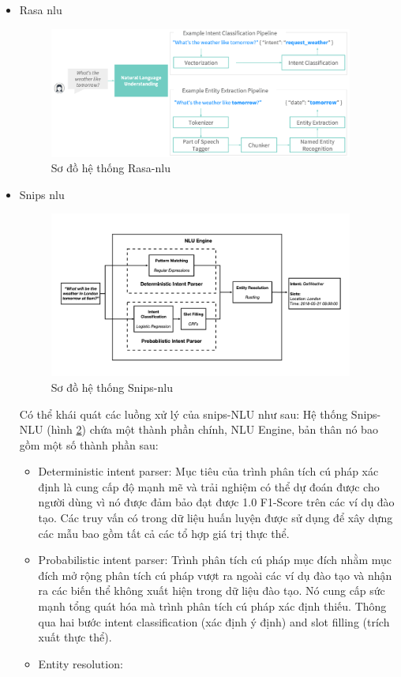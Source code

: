 \begin{itemize}
    \item Rasa \ac{nlu}
          \begin{figure}[htp]
              \centering
              \includegraphics[width=10cm]{images/Rasa-NLU.png}
              \caption{Sơ đồ hệ thống Rasa-\ac{nlu}}
              \label{fig:rasa-nlu}
          \end{figure}
    \item Snips \ac{nlu}
          \begin{figure}[htp]
              \centering
              \includegraphics[width=10cm]{images/Snips-NLU.png}
              \caption{Sơ đồ hệ thống Snips-\ac{nlu}}
              \label{fig:snips-nlu}
          \end{figure}
          Có thể khái quát các luồng xử lý của snips-NLU \cite{snips-nlu} như sau:
          Hệ thống Snips-NLU (hình \ref{fig:snips-nlu}) chứa một thành phần chính, NLU Engine, bản thân nó bao gồm một số thành phần sau:
          \begin{itemize}
              \item Deterministic intent parser: Mục tiêu của trình phân tích cú pháp xác định là cung cấp độ mạnh mẽ và trải nghiệm có thể dự đoán được cho người dùng vì nó được đảm bảo đạt được 1.0 F1-Score trên các ví dụ đào tạo. Các truy vấn có trong dữ liệu huấn luyện được sử dụng để xây dựng các mẫu bao gồm tất cả các tổ hợp giá trị thực thể.
              \item Probabilistic intent parser: Trình phân tích cú pháp mục đích nhằm mục đích mở rộng phân tích cú pháp vượt ra ngoài các ví dụ đào tạo và nhận ra các biến thể không xuất hiện trong dữ liệu đào tạo. Nó cung cấp sức mạnh tổng quát hóa mà trình phân tích cú pháp xác định thiếu. Thông qua hai bước intent classification (xác định ý định) and slot filling (trích xuất thực thể).
              \item Entity resolution:
          \end{itemize}
\end{itemize}
